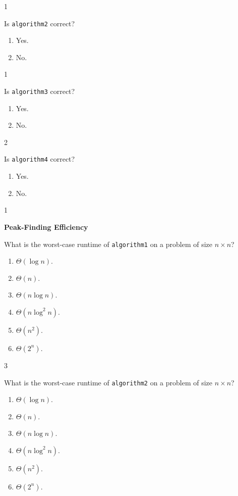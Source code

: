 \documentclass[12pt,twoside]{article}
\begin{document}
\begin{problems}
\begin{problemparts}
\ifsolution \solution{}
1
\fi

\problempart {} Is \texttt{algorithm2} correct?
\begin{enumerate}
\item Yes.
\item No.
\end{enumerate}

\ifsolution \solution{}
1
\fi

\problempart {} Is \texttt{algorithm3} correct?
\begin{enumerate}
\item Yes.
\item No.
\end{enumerate}

\ifsolution \solution{}
2
\fi

\problempart {} Is \texttt{algorithm4} correct?
\begin{enumerate}
\item Yes.
\item No.
\end{enumerate}

\ifsolution \solution{}
1
\fi

\end{problemparts}

\problem {} \textbf{Peak-Finding Efficiency}

\begin{problemparts}

\problempart {} What is the worst-case runtime of \texttt{algorithm1} on a problem of size $n \times n$?
\begin{enumerate}
\item $\Theta(\log n)$.
\item $\Theta(n)$.
\item $\Theta(n \log n)$.
\item $\Theta(n \log^2 n)$.
\item $\Theta(n^2)$.
\item $\Theta(2^n)$.
\end{enumerate}

\ifsolution \solution{}
3
\fi

\problempart {} What is the worst-case runtime of \texttt{algorithm2} on a problem of size $n \times n$?
\begin{enumerate}
\item $\Theta(\log n)$.
\item $\Theta(n)$.
\item $\Theta(n \log n)$.
\item $\Theta(n \log^2 n)$.
\item $\Theta(n^2)$.
\item $\Theta(2^n)$.
\end{enumerate}


\end{problemparts}
\end{problems}
\end{document}
